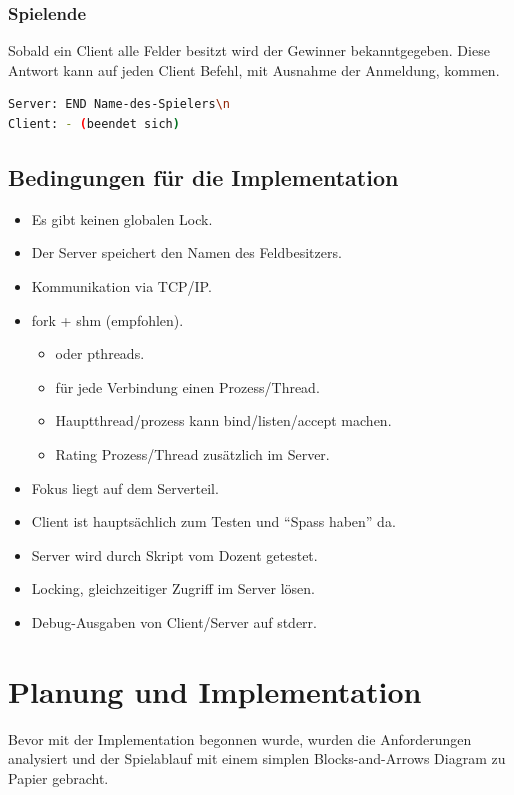 \subsection{Spielende}
Sobald ein Client alle Felder besitzt wird der Gewinner bekanntgegeben. Diese Antwort kann auf jeden Client Befehl, mit Ausnahme der Anmeldung, kommen.
\begin{lstlisting}[language=bash,numbers=none,caption={Spielende}]
Server: END Name-des-Spielers\n
Client: - (beendet sich)
\end{lstlisting}

\section{Bedingungen für die Implementation}
\begin{itemize}
	\item Es gibt keinen globalen Lock.
	\item Der Server speichert den Namen des Feldbesitzers.
	\item Kommunikation via TCP/IP.
	\item fork + shm (empfohlen).
	\begin{itemize}
		\item oder pthreads.
		\item für jede Verbindung einen Prozess/Thread.
		\item Hauptthread/prozess kann bind/listen/accept machen.
		\item Rating Prozess/Thread zusätzlich im Server.
	\end{itemize}
	\item Fokus liegt auf dem Serverteil.
	\item Client ist hauptsächlich zum Testen und ``Spass haben'' da.
	\item Server wird durch Skript vom Dozent getestet.
	\item Locking, gleichzeitiger Zugriff im Server lösen.
	\item Debug-Ausgaben von Client/Server auf stderr.
\end{itemize}

\chapter{Planung und Implementation}
Bevor mit der Implementation begonnen wurde, wurden die Anforderungen analysiert und der Spielablauf mit einem simplen Blocks-and-Arrows Diagram zu Papier gebracht.

